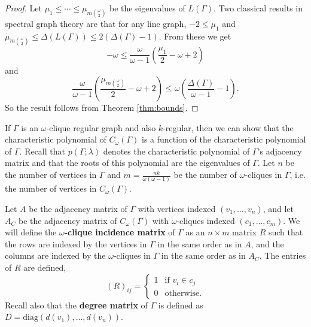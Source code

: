 \documentclass[12pt]{report}
\theoremstyle{definition}
\begin{document}
\begin{proof}
    Let $\mu_1 \leq \cdots \leq \mu_{m\binom{\omega}{2}}$ be the eigenvalues of $L(\Gamma)$. Two classical results in spectral graph theory are that for any line graph, $-2 \leq \mu_1$ and $\mu_{m\binom{\omega}{2}} \leq \Delta(L(\Gamma))\leq 2(\Delta(\Gamma)-1)$. From these we get 
    \[ -\omega \leq \frac{\omega}{\omega - 1}\left(\frac{\mu_1}{2} -\omega +2\right)\] and \[ \frac{\omega}{\omega - 1}\left(\frac{\mu_{m\binom{\omega}{2}}}{2} -\omega +2\right) \leq \omega\left(\frac{\Delta(\Gamma)}{\omega-1}-1\right).\]
    So the result follows from Theorem \ref{thm:bounds}.
\end{proof}\par
If $\Gamma$ is an $\omega$-clique regular graph and also $k$-regular, then we can show that the characteristic polynomial of $C_\omega(\Gamma)$ is a function of the characteristic polynomial of $\Gamma$. Recall that $p(\Gamma; \lambda)$ denotes the characteristic polynomial of $\Gamma$'s adjacency matrix and that the roots of this polynomial are the eigenvalues of $\Gamma$. Let $n$ be the number of vertices in $\Gamma$ and $m=\frac{nk}{\omega (\omega -1)}$ be the number of $\omega$-cliques in $\Gamma$, i.e. the number of vertices in $C_\omega(\Gamma)$.\par
Let $A$ be the adjacency matrix of $\Gamma$ with vertices indexed $(v_1, \ldots , v_n)$, and let $A_C$ be the adjacency matrix of $C_\omega(\Gamma)$ with $\omega$-cliques indexed $(c_1, \ldots , c_m)$. We will define the \textbf{$\omega$-clique incidence matrix} of $\Gamma$ as an $n\times m$ matrix $R$ such that the rows are indexed by the vertices in $\Gamma$ in the same order as in $A$, and the columns are indexed by the $\omega$-cliques in $\Gamma$ in the same order as in $A_C$. The entries of $R$ are defined,
\[(R)_{ij} = 
    \begin{cases}
        1 & \text{if } v_i \in c_j\\
        0 & \text{otherwise.}
    \end{cases}\]
Recall also that the \textbf{degree matrix} of $\Gamma$ is defined as $D=\text{diag}(d(v_1), \ldots , d(v_n))$.
\end{document}
